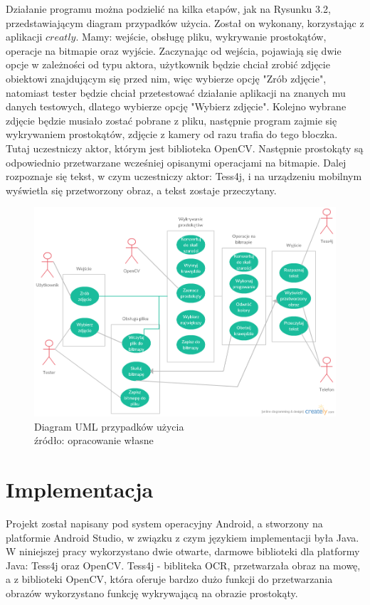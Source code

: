 \documentclass[eng,oneside]{mgr}
\begin{document}
\par Działanie programu można podzielić na kilka etapów, jak na Rysunku 3.2, przedstawiającym diagram przypadków użycia. Został on wykonany, korzystając z aplikacji $creatly$. Mamy: wejście, obsługę pliku, wykrywanie prostokątów, operacje na bitmapie oraz wyjście. Zaczynając od wejścia, pojawiają się dwie opcje w zależności od typu aktora, użytkownik będzie chciał zrobić zdjęcie obiektowi znajdującym się przed nim, więc wybierze opcję "Zrób zdjęcie", natomiast tester będzie chciał przetestować działanie aplikacji na znanych mu danych testowych, dlatego wybierze opcję "Wybierz zdjęcie". Kolejno wybrane zdjęcie będzie musiało zostać pobrane z pliku, następnie program zajmie się wykrywaniem prostokątów, zdjęcie z kamery od razu trafia do tego bloczka. Tutaj uczestniczy aktor, którym jest biblioteka OpenCV. Następnie prostokąty są odpowiednio przetwarzane wcześniej opisanymi operacjami na bitmapie. Dalej rozpoznaje się tekst, w czym uczestniczy aktor: Tess4j, i na urządzeniu mobilnym wyświetla się przetworzony obraz, a tekst zostaje przeczytany.
\begin{figure}
\centering
\includegraphics[scale=0.6]{usecasediagram.png}
\caption{Diagram UML przypadków użycia
\\ 
źródło: opracowanie własne}
\end{figure}
\chapter{Implementacja}
Projekt został napisany pod system operacyjny Android, a stworzony na platformie Android Studio, w związku z czym językiem implementacji była Java. W niniejszej pracy wykorzystano dwie otwarte, darmowe biblioteki dla platformy Java: Tess4j oraz OpenCV. Tess4j - bibliteka OCR, przetwarzała obraz na mowę, a z biblioteki OpenCV, która oferuje bardzo dużo funkcji do przetwarzania obrazów wykorzystano funkcję wykrywającą na obrazie prostokąty. 
\end{document}
